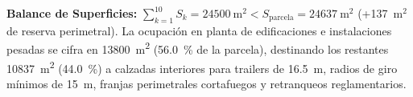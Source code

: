 \documentclass{report}
\begin{document}
\begin{enumerate}
\end{enumerate}
\noindent
\textbf{Balance de Superficies:} $\sum_{k=1}^{10} S_k = \SI{24500}{\square\metre} < S_{\text{parcela}} = \SI{24637}{\square\metre}$ (+137~$\text{m}^2$ de reserva perimetral). La ocupación en planta de edificaciones e instalaciones pesadas se cifra en \SI{13800}{\square\metre} (\SI{56.0}{\percent} de la parcela), destinando los restantes \SI{10837}{\square\metre} (\SI{44.0}{\percent}) a calzadas interiores para trailers de \SI{16.5}{\metre}, radios de giro mínimos de \SI{15}{\metre}, franjas perimetrales cortafuegos y retranqueos reglamentarios.

%
\end{document}
